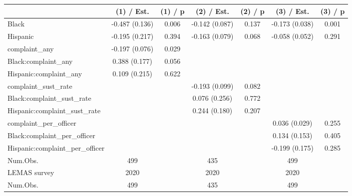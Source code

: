 
\begin{tabular}[t]{lcccccc}
\toprule
  & (1) / Est. & (1) / p & (2) / Est. & (2) / p & (3) / Est. & (3) / p\\
\midrule
Black & -0.487 
(0.136) & 0.006 & -0.142 
(0.087) & 0.137 & -0.173 
(0.038) & 0.001\\
Hispanic & -0.195 
(0.217) & 0.394 & -0.163 
(0.079) & 0.068 & -0.058 
(0.052) & 0.291\\
complaint\_any & -0.197 
(0.076) & 0.029 &  &  &  & \\
Black:complaint\_any & 0.388 
(0.177) & 0.056 &  &  &  & \\
Hispanic:complaint\_any & 0.109 
(0.215) & 0.622 &  &  &  & \\
complaint\_sust\_rate &  &  & -0.193 
(0.099) & 0.082 &  & \\
Black:complaint\_sust\_rate &  &  & 0.076 
(0.256) & 0.772 &  & \\
Hispanic:complaint\_sust\_rate &  &  & 0.244 
(0.180) & 0.207 &  & \\
complaint\_per\_officer &  &  &  &  & 0.036 
(0.029) & 0.255\\
Black:complaint\_per\_officer &  &  &  &  & 0.134 
(0.153) & 0.405\\
Hispanic:complaint\_per\_officer &  &  &  &  & -0.199 
(0.175) & 0.285\\
\midrule
Num.Obs. & 499 &  & 435 &  & 499 \vphantom{1} & \\
LEMAS survey & 2020 &  & 2020 &  & 2020 & \\
Num.Obs. & 499 &  & 435 &  & 499 & \\
\bottomrule
\end{tabular}
